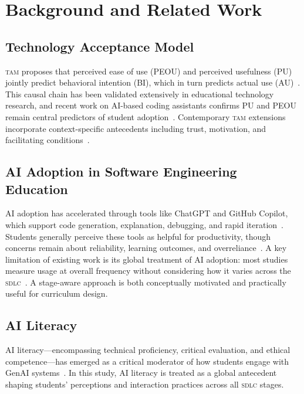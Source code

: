 \documentclass[sigconf,anonymous]{acmart}
\newcommand{\TAM}{\textsc{tam}\xspace}
\newcommand{\SDLC}{\textsc{sdlc}\xspace}
\newcommand{\GenAI}{GenAI\xspace}
\begin{document}
\section{Background and Related Work}
\label{sec:background}

\subsection{Technology Acceptance Model}
\TAM proposes that perceived ease of use (PEOU) and perceived usefulness
(PU) jointly predict behavioral intention (BI), which in turn predicts
actual use (AU)~\cite{davis1989a, davis1989b}. This causal chain has been
validated extensively in educational technology research, and recent work
on AI-based coding assistants confirms PU and PEOU remain central
predictors of student adoption~\cite{ali2025, gupta2021, simsek2025}.
Contemporary \TAM extensions incorporate context-specific antecedents
including trust, motivation, and facilitating
conditions~\cite{ali2025, karaoglan2023}.

\subsection{AI Adoption in Software Engineering Education}
AI adoption has accelerated through tools like ChatGPT and GitHub
Copilot, which support code generation, explanation, debugging, and rapid
iteration~\cite{becker2023, kazemitabaar2023, ali2025}. Students
generally perceive these tools as helpful for productivity, though
concerns remain about reliability, learning outcomes, and
overreliance~\cite{pirzado2024, sakib2023}. A key limitation of existing
work is its global treatment of AI adoption: most studies measure usage
at overall frequency without considering how it varies across the
\SDLC~\cite{russo2024}. A stage-aware approach is both conceptually
motivated and practically useful for curriculum design.

\subsection{AI Literacy}
AI literacy---encompassing technical proficiency, critical evaluation, and
ethical competence---has emerged as a critical moderator of how students
engage with \GenAI systems~\cite{lee2024}. In this study, AI literacy
is treated as a global antecedent shaping students' perceptions and
interaction practices across all \SDLC stages.
\end{document}
